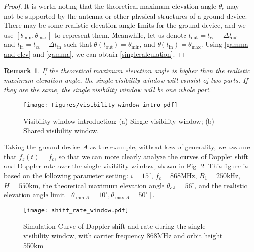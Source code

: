 \documentclass{IEEEtaes}
\theoremstyle{plain}
\newtheorem{remark}{Remark}
\begin{document}
\begin{proof}
It is worth noting that the theoretical maximum elevation angle $\theta_c$ may not be supported by the antenna or other physical structures of a ground device. There may be some realistic elevation angle limits for the ground device, and we use $[\theta_{\text{min}},\theta_{\text{max}}]$ to represent them. Meanwhile, let us denote $t_{\text{out}}=t_{cv} \pm \Delta t_{\text{out}}$ and $t_{\text{in}}=t_{cv} \pm \Delta t_{\text{in}}$ such that $\theta(t_{\text{out}}) = \theta_{\text{min}}$, and $\theta( t_{\text{in}}) = \theta_{\text{max}}$. Using \eqref{gamma and elev} and \eqref{gamma},  we can obtain \eqref{singlecalculation}.  
\end{proof}

\begin{remark}If the theoretical maximum elevation angle is higher than the realistic maximum elevation angle, the single visibility window will consist of two parts. If they are the same, the single visibility window will be one whole part. 
\end{remark}

\begin{figure}[ht]
  \centering
  \texttt{[image: Figures/visibility\_window\_intro.pdf]}
  \caption{ Visibility window introduction: (a) Single visibility window;      (b) Shared visibility window.}
  \label{windows}
\end{figure}

Taking the ground device $A$ as the example, without loss of generality, we assume that $f_k(t) = f_c$, so that we can more clearly analyze the curves of Doppler shift and Doppler rate over the single visibility window, shown in Fig. \ref{shift_rate_window}. This figure is based on the following parameter setting: $i = 15^\circ$, $f_c = 868$MHz, $B_1 = 250$kHz, $H = 550$km, the theoretical maximum elevation angle $\theta_{c\!A}=56^\circ$, and the realistic elevation angle limit $[\theta_{\min \!A}=10^\circ, \theta_{\max \!A}=50^\circ]$. 
\begin{figure}[ht]
  \centering
  \texttt{[image: shift\_rate\_window.pdf]}
  \caption{Simulation Curve of Doppler shift and rate during the single visibility window, with carrier frequency 868MHz and orbit height 550km}
  \label{shift_rate_window}
\end{figure}
\end{document}
